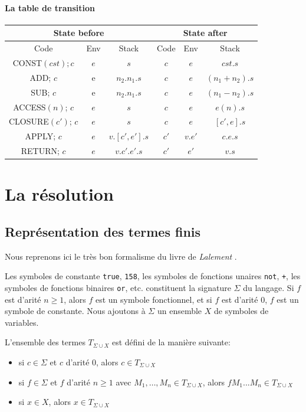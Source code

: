 \documentclass[11pt]{book}
\begin{document}
\subsubsection{La table de transition}
\begin{tabular}{c|c|c || c|c|c}
  \multicolumn{3}{c||}{State before} & \multicolumn{3}{c}{State after} \\
  \hline
  Code & Env & Stack & Code & Env & Stack \\
  \hline
  CONST$(cst); c$ & $e$ & $s$  & $c$ & $e$&  $cst.s$ \\
  ADD; $c$ &e& $n_2.n_1.s$ & $c$ & $e$& $(n_1 + n_2).s$ \\
  SUB; $c$ &e& $n_2.n_1.s$ & $c$ & $e$& $(n_1 − n_2).s$ \\
  
  ACCESS$(n)$; $c$ & $e$ & $s$ &  $c$ & $e$ & $e(n).s$ \\
  CLOSURE$(c')$; $c$ & $e$ & $s$ & $c$ & $e$ & $[c', e].s$ \\
  APPLY; $c$ & $e$ & $v.[c', e'].s$ &$c'$& $v.e'$ & $c.e.s$ \\
  RETURN; $c$ & $e$ & $v.c'.e'.s$ & $c'$ & $e'$ & $v.s$  
\end{tabular}

\chapter{La résolution}
\section{Représentation des termes finis}
Nous reprenons ici le très bon formalisme du livre de \textit{Lalement} \cite{lalement}.


Les symboles de constante \verb+true+, \verb+158+, les symboles de fonctions unaires \verb+not+, \verb-+-,
les symboles de fonctions binaires \verb+or+, etc. constituent la signature $\Sigma$ du langage.
Si $f$ est d'arité $n \geq 1$, alors $f$ est un symbole fonctionnel, et si $f$ est d'arité $0$, $f$ est un symbole de constante.
Nous ajoutons à $\Sigma$ un ensemble $X$ de symboles de variables.

L'ensemble des termes $T_{\Sigma \cup X}$ est défini de la manière suivante:
\begin{itemize}
	\item si $c \in \Sigma$ et $c$ d'arité $0$, alors $c \in T_{\Sigma \cup X}$ 
	\item si $f \in \Sigma$ et $f$ d'arité $n \geq  1$ avec $M_1, \dots, M_n \in T_{\Sigma \cup X}$, alors $f M_1 ... M_n \in T_{\Sigma \cup X}$
	\item si $x \in X$, alors $x \in T_{\Sigma \cup X}$
\end{itemize}
\end{document}
